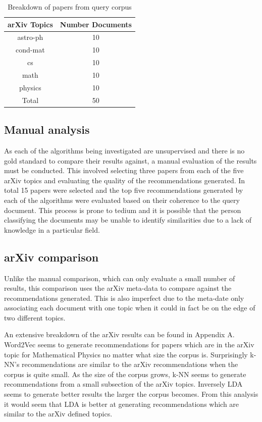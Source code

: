\begin{table}[h]
    \centering
    \begin{tabular}{|c c|}
         \hline
         arXiv Topics & Number Documents \\ [0.5ex]
         \hline\hline
         astro-ph & 10 \\
         cond-mat & 10 \\
         cs & 10 \\
         math & 10 \\
         physics & 10 \\ [0.5ex]
         \hline\hline
         Total & 50\\ [1ex]
         \hline
    \end{tabular}
    \caption{Breakdown of papers from query corpus}
    \label{table:queryBreakdown}
\end{table}

\subsection{Manual analysis}
As each of the algorithms being investigated are unsupervised and there is no gold standard to compare their results against, a manual evaluation of the results must be conducted.
This involved selecting three papers from each of the five arXiv topics and evaluating the quality of the recommendations generated.
In total 15 papers were selected and the top five recommendations generated by each of the algorithms were evaluated based on their coherence to the query document.
This process is prone to tedium and it is possible that the person classifying the documents may be unable to identify similarities due to a lack of knowledge in a particular field.

\subsection{arXiv comparison}
Unlike the manual comparison, which can only evaluate a small number of results, this comparison uses the arXiv meta-data to compare against the recommendations generated.
This is also imperfect due to the meta-date only associating each document with one topic when it could in fact be on the edge of two different topics.

An extensive breakdown of the arXiv results can be found in Appendix A.
Word2Vec seems to generate recommendations for papers which are in the arXiv topic for Mathematical Physics no matter what size the corpus is.
Surprisingly k-NN's recommendations are similar to the arXiv recommendations when the corpus is quite small.
As the size of the corpus grows, k-NN seems to generate recommendations from a small subsection of the arXiv topics.
Inversely LDA seems to generate better results the larger the corpus becomes.
From this analysis it would seem that LDA is better at generating recommendations which are similar to the arXiv defined topics.

